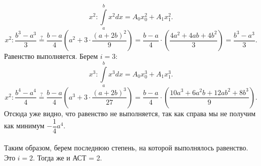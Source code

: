 \documentclass[a4paper, 12pt]{article}
\begin{document}
	$$x^2 : \int\limits_a^bx^2 dx = A_0x_0^2 + A_1x_1^2.$$
	$$x^2 : \dfrac{b^3-a^3}{3} \overset{?}{=} \dfrac{b-a}{4}\left(a^2 + 3\cdot \dfrac{(a+2b)^2}{9}\right) = \dfrac{b-a}{4}\cdot\left( \dfrac{4a^2 + 4ab + 4b^2}{3}\right) = \dfrac{b^3-a^3}{3}.$$
	Равенство выполняется. Берем $i=3$:
	$$x^3 : \int\limits_a^bx^3 dx = A_0x_0^3 + A_1x_1^3.$$
	$$x^2 : \dfrac{b^4-a^4}{4} \overset{?}{=} \dfrac{b-a}{4}\left(a^3 + 3\cdot \dfrac{(a+2b)^3}{27}\right) = \dfrac{b-a}{4}\cdot\left( \dfrac{10a^3+6a^2b + 12ab^2 + 8b^3}{9}\right).$$
	Отсюда уже видно, что равенство не выполняется, так как справа мы не получим как минимум $-\dfrac14 a^4$.\\\\
	Таким образом, берем последнюю степень, на которой выполнялось равенство. Это $i=2$. Тогда же и АСТ = 2.
\end{document}

